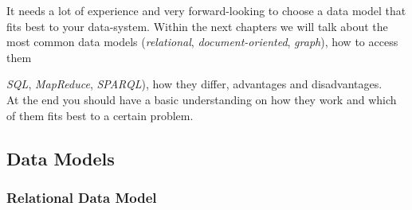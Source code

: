 It needs a lot of experience and very forward-looking to choose a data model that fits best to your data-system. Within the next chapters we will talk about the most common data models (\textit{relational}, \textit{document-oriented}, \textit{graph}), how to access them {\textit{SQL}, \textit{MapReduce}, \textit{SPARQL}), how they differ, advantages and disadvantages. \\
At the end you should have a basic understanding on how they work and which of them fits best to a certain problem.

\subsection{Data Models}
\label{tf_dma_datamodels}

\subsubsection{Relational Data Model}
\label{tf_dma_datamodels_rdm}

}
